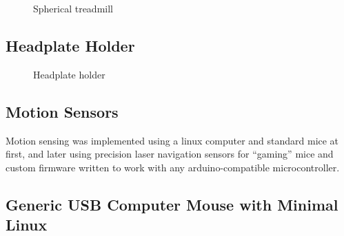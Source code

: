 \documentclass[
  12pt,
]{report}
\numberwithin{figure}{section}
\numberwithin{table}{section}
\numberwithin{equations}{section}
\begin{document}
\begin{figure}
\centering


\caption{Spherical treadmill}

\label{fig:spherical-tradmill}

\end{figure}

\hypertarget{headplate-holder}{%
\subsection{Headplate Holder}\label{headplate-holder}}

\begin{figure}
\centering


\caption{Headplate holder}

\label{fig:headplate-holder}

\end{figure}

\hypertarget{motion-sensors}{%
\subsection{Motion Sensors}\label{motion-sensors}}

Motion sensing was implemented using a linux computer and standard mice
at first, and later using precision laser navigation sensors for
``gaming'' mice and custom firmware written to work with any
arduino-compatible microcontroller.

\hypertarget{generic-usb-computer-mouse-with-minimal-linux}{%
\subsection{Generic USB Computer Mouse with Minimal
Linux}\label{generic-usb-computer-mouse-with-minimal-linux}}
\end{document}
